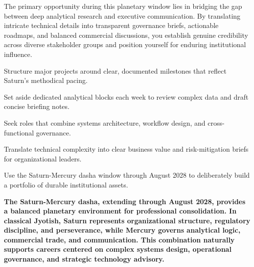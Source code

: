 {\fontsize{9}{13}\selectfont The primary opportunity during this planetary window lies in bridging the gap between deep analytical research and executive communication. By translating intricate technical details into transparent governance briefs, actionable roadmaps, and balanced commercial discussions, you establish genuine credibility across diverse stakeholder groups and position yourself for enduring institutional influence.}\par\vspace{1.8mm}

\begin{diamondlist}
  \item {\fontsize{8.5}{12}\selectfont Structure major projects around clear, documented milestones that reflect Saturn's methodical pacing.}
  \item {\fontsize{8.5}{12}\selectfont Set aside dedicated analytical blocks each week to review complex data and draft concise briefing notes.}
  \item {\fontsize{8.5}{12}\selectfont Seek roles that combine systems architecture, workflow design, and cross-functional governance.}
  \item {\fontsize{8.5}{12}\selectfont Translate technical complexity into clear business value and risk-mitigation briefs for organizational leaders.}
  \item {\fontsize{8.5}{12}\selectfont Use the Saturn-Mercury dasha window through August 2028 to deliberately build a portfolio of durable institutional assets.}
\end{diamondlist}


\label{topic66}

{\fontsize{9.5}{13.8}\selectfont\bfseries\color{DeepSlate} The Saturn-Mercury dasha, extending through August 2028, provides a balanced planetary environment for professional consolidation. In classical Jyotish, Saturn represents organizational structure, regulatory discipline, and perseverance, while Mercury governs analytical logic, commercial trade, and communication. This combination naturally supports careers centered on complex systems design, operational governance, and strategic technology advisory.}\par\vspace{2mm}

